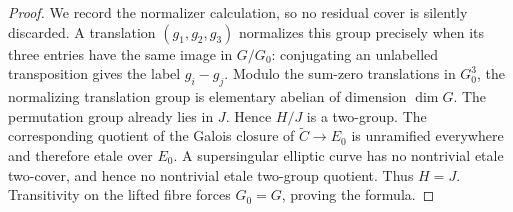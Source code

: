 \begin{proof}
We record the normalizer calculation, so no residual cover is
silently discarded. A translation $(g_1,g_2,g_3)$ normalizes this
group precisely when its three entries have the same image in
$G/G_0$: conjugating an unlabelled transposition gives the label
$g_i-g_j$. Modulo the sum-zero translations in $G_0^3$, the
normalizing translation group is elementary abelian of dimension
$\dim G$. The permutation group already lies in $J$. Hence
$H/J$ is a two-group. The corresponding quotient of the Galois
closure of $\widetilde C\to E_0$ is unramified everywhere and
therefore etale over $E_0$. A supersingular elliptic curve has no
nontrivial etale two-cover, and hence no nontrivial etale
two-group quotient. Thus $H=J$. Transitivity on the lifted
fibre forces $G_0=G$, proving the formula.
\end{proof}

